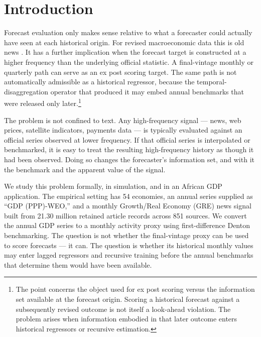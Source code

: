 \documentclass[preprint,12pt,authoryear]{elsarticle}
\begin{document}
\section{Introduction}

Forecast evaluation only makes sense relative to what a forecaster could
actually have seen at each historical origin. For revised macroeconomic data
this is old news \citep{croushorestark2001,croushore2006}. It has a further
implication when the forecast target is constructed at a higher frequency than
the underlying official statistic. A final-vintage monthly or quarterly path
can serve as an ex post scoring target. The same path is not automatically
admissible as a historical regressor, because the temporal-disaggregation
operator that produced it may embed annual benchmarks that were released only
later.\footnote{The point concerns the object used for ex post scoring versus
the information set available at the forecast origin. Scoring a historical
forecast against a subsequently revised outcome is not itself a look-ahead
violation. The problem arises when information embodied in that later outcome
enters historical regressors or recursive estimation.}

The problem is not confined to text. Any high-frequency signal --- news, web
prices, satellite indicators, payments data --- is typically evaluated against
an official series observed at lower frequency. If that official series is
interpolated or benchmarked, it is easy to treat the resulting high-frequency
history as though it had been observed. Doing so changes the forecaster's
information set, and with it the benchmark and the apparent value of the
signal.

We study this problem formally, in simulation, and in an African GDP
application. The empirical setting has 54 economies, an annual series supplied
as ``GDP (PPP)-WEO,'' and a monthly Growth/Real Economy (GRE) news signal
built from 21.30 million retained article records across 851 sources. We
convert the annual GDP series to a monthly activity proxy using first-difference
Denton benchmarking. The question is not whether the final-vintage proxy can be
used to score forecasts --- it can. The question is whether its historical
monthly values may enter lagged regressors and recursive training before the
annual benchmarks that determine them would have been available.
\end{document}
